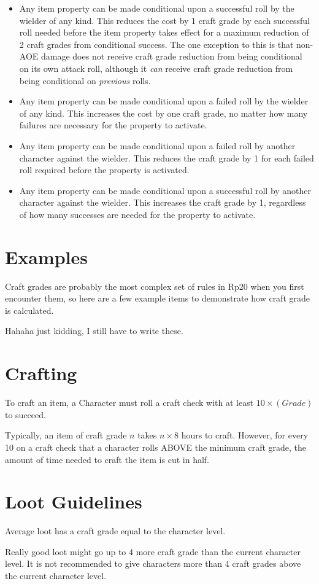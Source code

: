 \begin{itemize}
\item Any item property can be made conditional upon a successful roll by the wielder of any kind. This reduces the cost by 1 craft grade by each successful roll needed before the item property takes effect for a maximum reduction of 2 craft grades from conditional success. The one exception to this is that non-AOE damage does not receive craft grade reduction from being conditional on its own attack roll, although it \emph{can} receive craft grade reduction from being conditional on \emph{previous} rolls.

\item Any item property can be made conditional upon a failed roll by the wielder of any kind. This increases the cost by one craft grade, no matter how many failures are necessary for the property to activate.

\item Any item property can be made conditional upon a failed roll by another character against the wielder. This reduces the craft grade by 1 for each failed roll required before the property is activated.

\item Any item property can be made conditional upon a successful roll by another character against the wielder. This increases the craft grade by 1, regardless of how many successes are needed for the property to activate.
\end{itemize}

\section{Examples}
Craft grades are probably the most complex set of rules in Rp20 when you first encounter them, so here are a few example items to demonstrate how craft grade is calculated.

Hahaha just kidding, I still have to write these.

\section{Crafting}
To craft an item, a Character must roll a craft check with at least $10 \times (Grade)$ to succeed.

Typically, an item of craft grade $n$ takes $n \times 8$ hours to craft. However, for every 10 on a craft check that a character rolls ABOVE the minimum craft grade, the amount of time needed to craft the item is cut in half.

\section{Loot Guidelines}
Average loot has a craft grade equal to the character level.

Really good loot might go up to 4 more craft grade than the current character level. It is not recommended to give characters more than 4 craft grades above the current character level.
